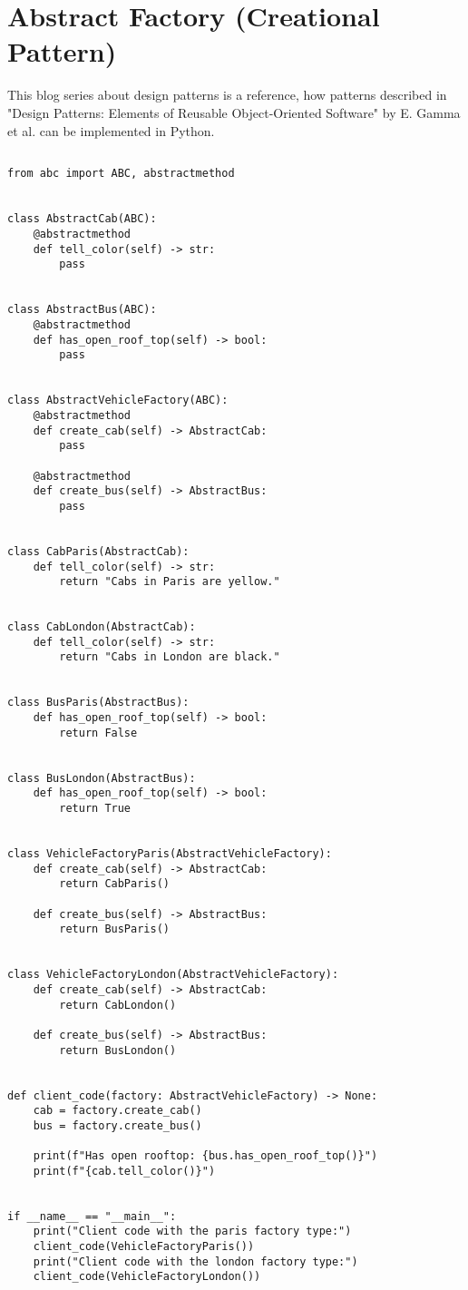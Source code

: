\documentclass{article}
\begin{document}
  \section{Abstract Factory (Creational Pattern)}

  This blog series about design patterns is a reference, how patterns
  described in "Design Patterns: Elements of Reusable Object-Oriented Software"
  by E. Gamma et al. can be implemented in Python.

  \subsection{}

  \begin{lstlisting}
from abc import ABC, abstractmethod


class AbstractCab(ABC):
    @abstractmethod
    def tell_color(self) -> str:
        pass


class AbstractBus(ABC):
    @abstractmethod
    def has_open_roof_top(self) -> bool:
        pass


class AbstractVehicleFactory(ABC):
    @abstractmethod
    def create_cab(self) -> AbstractCab:
        pass

    @abstractmethod
    def create_bus(self) -> AbstractBus:
        pass


class CabParis(AbstractCab):
    def tell_color(self) -> str:
        return "Cabs in Paris are yellow."


class CabLondon(AbstractCab):
    def tell_color(self) -> str:
        return "Cabs in London are black."


class BusParis(AbstractBus):
    def has_open_roof_top(self) -> bool:
        return False


class BusLondon(AbstractBus):
    def has_open_roof_top(self) -> bool:
        return True


class VehicleFactoryParis(AbstractVehicleFactory):
    def create_cab(self) -> AbstractCab:
        return CabParis()

    def create_bus(self) -> AbstractBus:
        return BusParis()


class VehicleFactoryLondon(AbstractVehicleFactory):
    def create_cab(self) -> AbstractCab:
        return CabLondon()

    def create_bus(self) -> AbstractBus:
        return BusLondon()


def client_code(factory: AbstractVehicleFactory) -> None:
    cab = factory.create_cab()
    bus = factory.create_bus()

    print(f"Has open rooftop: {bus.has_open_roof_top()}")
    print(f"{cab.tell_color()}")


if __name__ == "__main__":
    print("Client code with the paris factory type:")
    client_code(VehicleFactoryParis())
    print("Client code with the london factory type:")
    client_code(VehicleFactoryLondon())
  \end{lstlisting}
\end{document}
